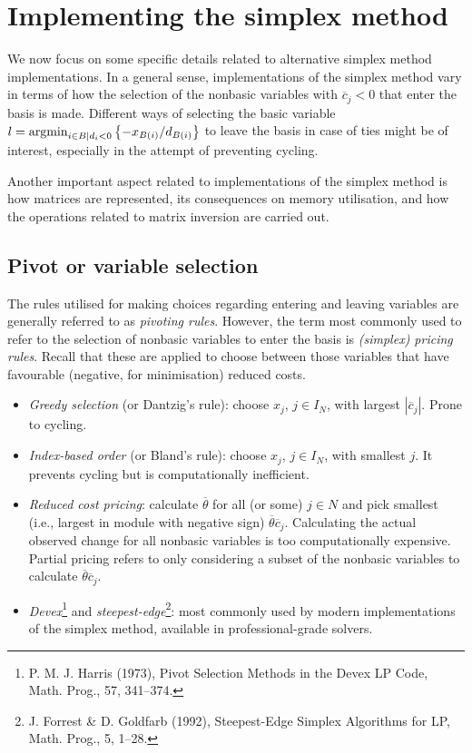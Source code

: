 \section{Implementing the simplex method}

We now focus on some specific details related to alternative simplex method implementations. In a general sense, implementations of the simplex method vary in terms of how the selection of the nonbasic variables with $\overline{c}_j < 0$ that enter the basis is made. Different ways of selecting the basic variable $l = \mathop{\rm argmin}_{i \in B \mid d_i <0}\left\{ -x_{B(i)}/d_{B(i)} \right \}$ to leave the basis in case of ties might be of interest, especially in the attempt of preventing cycling.

Another important aspect related to implementations of the simplex method is how matrices are represented, its consequences on memory utilisation, and how the operations related to matrix inversion are carried out. 


\subsection{Pivot or variable selection}

The rules utilised for making choices regarding entering and leaving variables are generally referred to as \emph{pivoting rules}. However, the term most commonly used to refer to the selection of nonbasic variables to enter the basis is \emph{(simplex) pricing rules}. Recall that these are applied to choose between those variables that have favourable (negative, for minimisation) reduced costs.

\begin{itemize}
	\item \emph{Greedy selection} (or Dantzig's rule): choose $x_j$, $j \in I_N$, with largest $|\overline{c}_j|$. Prone to cycling.
	\item \emph{Index-based order} (or Bland's rule): choose $x_j$,  $j \in I_N$, with smallest $j$. It prevents cycling but is computationally inefficient. 
	\item \emph{Reduced cost pricing}: calculate $\overline{\theta}$ for all (or some) $j \in N$ and pick smallest (i.e., largest in module with negative sign) $\overline{\theta}\overline{c}_j$. Calculating the actual observed change for all nonbasic variables is too computationally expensive. Partial pricing refers to only considering a subset of the nonbasic variables to calculate $\overline{\theta}\overline{c}_j$.
	\item \emph{Devex}\footnote{P. M. J. Harris (1973), Pivot Selection Methods in the Devex LP Code, Math. Prog., 57, 341--374.} and \emph{steepest-edge}\footnote{J. Forrest \& D. Goldfarb (1992), Steepest-Edge Simplex Algorithms for LP, Math. Prog., 5, 1--28.}: most commonly used by modern implementations of the simplex method, available in professional-grade solvers. 
\end{itemize}


